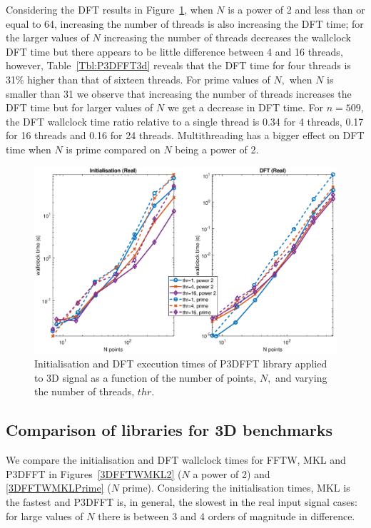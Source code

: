 \documentclass[a4paper]{article}
\begin{document}
Considering the DFT results in Figure~\ref{3DP3DFFT}, when $N$ is a
power of 2 and less than or equal to 64, increasing the number of
threads is also increasing the DFT time; for the larger values of $N$
increasing the number of threads decreases the wallclock DFT time but
there appears to be little difference between 4 and 16 threads,
however, Table~\ref{Tbl:P3DFFT3d} reveals that the DFT time for four
threads is 31\% higher than that of sixteen threads. For prime values
of $N,$ when $N$ is smaller than 31 we observe that increasing the
number of threads increases the DFT time but for larger values of $N$
we get a decrease in DFT time. For $n=509,$ the DFT wallclock time
ratio relative to a single thread is 0.34 for 4 threads, 0.17 for 16
threads and 0.16 for 24 threads. Multithreading has a bigger effect on
DFT time when $N$ is prime compared on $N$ being a power of 2.



\begin{figure}[htb]
    \centering
    \includegraphics[width=0.9\linewidth]{../results/p3dfft_3d_thr.eps}
  \caption{Initialisation and DFT execution times of P3DFFT library applied to 3D signal as a function of the
    number of points, $N,$ and varying the number of threads, $thr.$ }
  \label{3DP3DFFT}
\end{figure}







\subsection{Comparison of libraries for 3D benchmarks}\label{Sec:3DComp}

We compare the initialisation and DFT wallclock times for FFTW, MKL
and P3DFFT in Figures~\ref{3DFFTWMKL2} ($N$ a power of 2) and
\ref{3DFFTWMKLPrime} ($N$ prime). Considering the initialisation
times, MKL is the fastest and P3DFFT is, in general, the slowest in
the real input signal cases: for large values of $N$ there is between
3 and 4 orders of magnitude in difference.
\end{document}
